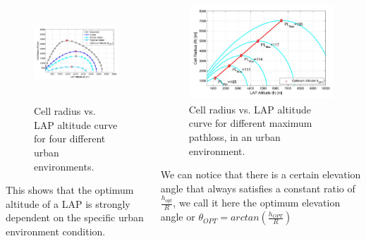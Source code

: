 \documentclass{beamer}
\begin{document}
\begin{frame}{}
\begin{columns}
\begin{column}{0.5\textwidth}
    \begin{figure}
    \centering
    \includegraphics[width=5.67cm, height=3.64cm]{Figures/Figure4.png}
    \caption{Cell radius vs. LAP altitude curve for four different urban environments.}
    \label{fig:4}
\end{figure}
This shows that the optimum altitude of a LAP is strongly dependent on the specific urban environment condition.

\end{column}
\begin{column}{0.5\textwidth}  %
    \begin{figure}
    \centering
    \includegraphics[width=5.61cm, height=3.58cm]{Figures/Figure5.png}
    \caption{Cell radius vs. LAP altitude curve for different maximum pathloss, in an urban environment.}
    \label{fig:5}
\end{figure}
We can notice that there is a certain elevation angle that always satisfies a constant ratio of $\frac{h_{opt}}{R}$, we call it here the optimum elevation angle or $\theta_{OPT} = arctan(\frac{h_{OPT}}{R})$
\end{column}
\end{columns}

\end{frame}
\end{document}
